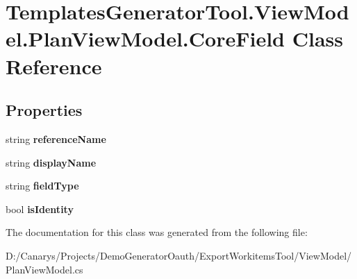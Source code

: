 \hypertarget{class_templates_generator_tool_1_1_view_model_1_1_plan_view_model_1_1_core_field}{}\section{Templates\+Generator\+Tool.\+View\+Model.\+Plan\+View\+Model.\+Core\+Field Class Reference}
\label{class_templates_generator_tool_1_1_view_model_1_1_plan_view_model_1_1_core_field}
\subsection*{Properties}
\begin{DoxyCompactItemize}
\item 
\mbox{\label{class_templates_generator_tool_1_1_view_model_1_1_plan_view_model_1_1_core_field_a3f1e4c7c249c543021ab3240574337b1}} 
string {\bfseries reference\+Name}
\item 
\mbox{\label{class_templates_generator_tool_1_1_view_model_1_1_plan_view_model_1_1_core_field_a51a5445ad357d151bddea1f1e3e6d2f0}} 
string {\bfseries display\+Name}
\item 
\mbox{\label{class_templates_generator_tool_1_1_view_model_1_1_plan_view_model_1_1_core_field_ac2c564a7bfd84a492e07e549707f40eb}} 
string {\bfseries field\+Type}
\item 
\mbox{\label{class_templates_generator_tool_1_1_view_model_1_1_plan_view_model_1_1_core_field_a5533099dc8ce9adab762bfe61bebf79e}} 
bool {\bfseries is\+Identity}
\end{DoxyCompactItemize}


The documentation for this class was generated from the following file\+:\begin{DoxyCompactItemize}
\item 
D\+:/\+Canarys/\+Projects/\+Demo\+Generator\+Oauth/\+Export\+Workitems\+Tool/\+View\+Model/Plan\+View\+Model.\+cs\end{DoxyCompactItemize}
